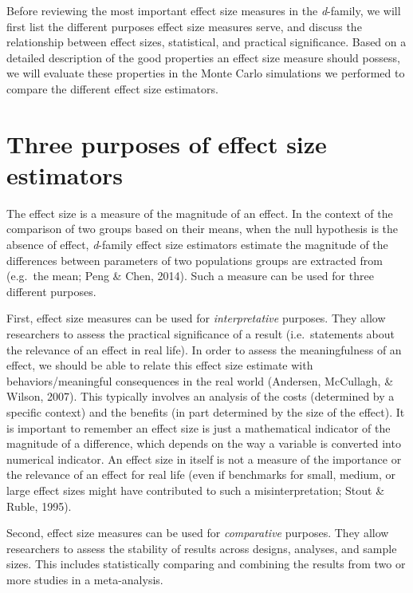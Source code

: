 \documentclass[
  english,
  man,floatsintext]{apa6}
\begin{document}
Before reviewing the most important effect size measures in the \emph{d}-family, we will first list the different purposes effect size measures serve, and discuss the relationship between effect sizes, statistical, and practical significance. Based on a detailed description of the good properties an effect size measure should possess, we will evaluate these properties in the Monte Carlo simulations we performed to compare the different effect size estimators.

\hypertarget{three-purposes-of-effect-size-estimators}{%
\section{Three purposes of effect size estimators}\label{three-purposes-of-effect-size-estimators}}

The effect size is a measure of the magnitude of an effect. In the context of the comparison of two groups based on their means, when the null hypothesis is the absence of effect, \emph{d}-family effect size estimators estimate the magnitude of the differences between parameters of two populations groups are extracted from (e.g.~the mean; Peng \& Chen, 2014). Such a measure can be used for three different purposes.

First, effect size measures can be used for \emph{interpretative} purposes. They allow researchers to assess the practical significance of a result (i.e.~statements about the relevance of an effect in real life). In order to assess the meaningfulness of an effect, we should be able to relate this effect size estimate with behaviors/meaningful consequences in the real world (Andersen, McCullagh, \& Wilson, 2007). This typically involves an analysis of the costs (determined by a specific context) and the benefits (in part determined by the size of the effect). It is important to remember an effect size is just a mathematical indicator of the magnitude of a difference, which depends on the way a variable is converted into numerical indicator. An effect size in itself is not a measure of the importance or the relevance of an effect for real life (even if benchmarks for small, medium, or large effect sizes might have contributed to such a misinterpretation; Stout \& Ruble, 1995).

Second, effect size measures can be used for \emph{comparative} purposes. They allow researchers to assess the stability of results across designs, analyses, and sample sizes. This includes statistically comparing and combining the results from two or more studies in a meta-analysis.
\end{document}
